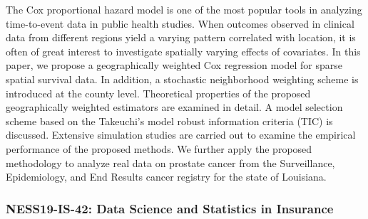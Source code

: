\begin{itemize}
The Cox proportional hazard model is one of the most popular tools in analyzing time-to-event data in public health studies. When outcomes observed in clinical data from different regions yield a varying pattern correlated with location, it is often of great interest to investigate spatially varying effects of covariates. In this paper, we propose a geographically weighted Cox regression model for sparse spatial survival data. In addition, a stochastic neighborhood weighting scheme is introduced at the county level. Theoretical properties of the proposed geographically weighted estimators are examined in detail. A model selection scheme based on the Takeuchi’s model robust information criteria (TIC) is discussed. Extensive simulation studies are carried out to examine the empirical performance of the proposed methods. We further apply the proposed methodology to analyze real data on prostate cancer from the Surveillance, Epidemiology, and End Results cancer registry for the state of Louisiana.

\end{itemize}

\subsubsection*{NESS19-IS-42: Data Science and Statistics in Insurance}

